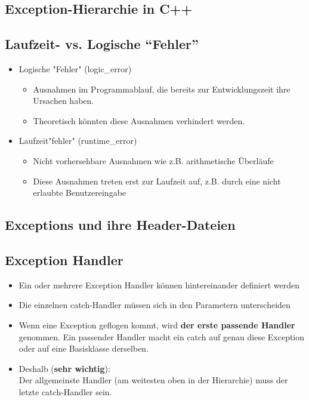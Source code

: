 \subsection{Exception-Hierarchie in C++}
\label{sec:Exception-Hierarchie in C++}

\subsection{Laufzeit- vs. Logische "`Fehler"'}
\label{sec:Laufzeit- vs. "Logische Fehler"}
\begin{itemize}
	\item Logische "Fehler" (logic\_error)
	\begin{itemize}
		\item Ausnahmen im Programmablauf, die bereits zur Entwicklungszeit ihre Ursachen haben.
		\item Theoretisch könnten diese Ausnahmen verhindert werden.
	\end{itemize}
	\item Laufzeit"fehler" (runtime\_error)
	\begin{itemize}
		\item Nicht vorhersehbare Ausnahmen wie z.B. arithmetische Überläufe
		\item Diese Ausnahmen treten erst zur Laufzeit auf, z.B. durch eine nicht erlaubte Benutzereingabe
	\end{itemize}
\end{itemize}

\subsection{Exceptions und ihre Header-Dateien}
\label{sec:Exceptions und ihre Header-Dateien}

\subsection{Exception Handler}
\label{sec:Exception Handler}
\begin{itemize}
	\item Ein oder mehrere Exception Handler können hintereinander definiert werden
	\item Die einzelnen catch-Handler müssen sich in den Parametern unterscheiden
	\item Wenn eine Exception geflogen kommt, wird \textbf{der erste passende Handler} genommen. Ein passender Handler macht ein catch auf genau diese Exception oder auf eine Basisklasse derselben.
	\item \begin{achtung}
	Deshalb (\textbf{sehr wichtig}):\\
	Der allgemeinste Handler (am weitesten oben in der Hierarchie) muss der letzte catch-Handler sein.
	\end{achtung}
\end{itemize}

